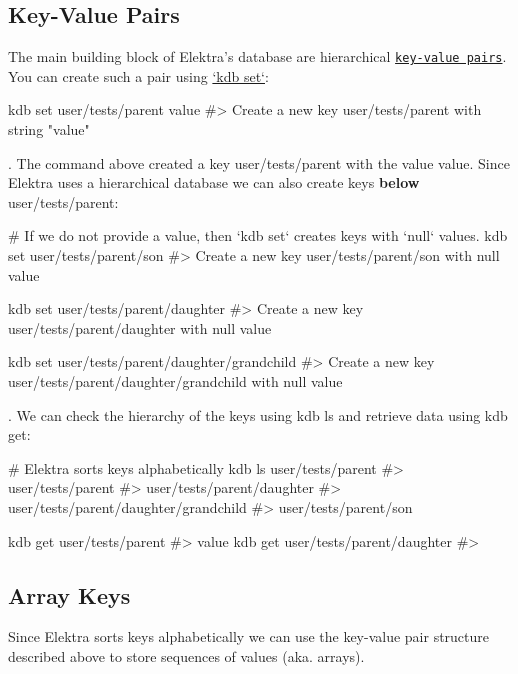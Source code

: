 \subsection*{Key-\/\+Value Pairs}

The main building block of Elektra’s database are hierarchical \href{https://en.wikipedia.org/wiki/Key-value_database}{\tt key-\/value pairs}. You can create such a pair using \hyperlink{md_doc_help_kdb-set_doc_help_kdb-set_md}{`kdb set`}\+:


\begin{DoxyCode}
kdb set user/tests/parent value
#> Create a new key user/tests/parent with string "value"
\end{DoxyCode}


. The command above created a key {\ttfamily user/tests/parent} with the value {\ttfamily value}. Since Elektra uses a hierarchical database we can also create keys {\bfseries below} {\ttfamily user/tests/parent}\+:


\begin{DoxyCode}
# If we do not provide a value, then `kdb set` creates keys with `null` values.
kdb set user/tests/parent/son
#> Create a new key user/tests/parent/son with null value

kdb set user/tests/parent/daughter
#> Create a new key user/tests/parent/daughter with null value

kdb set user/tests/parent/daughter/grandchild
#> Create a new key user/tests/parent/daughter/grandchild with null value
\end{DoxyCode}


. We can check the hierarchy of the keys using {\ttfamily kdb ls} and retrieve data using {\ttfamily kdb get}\+:


\begin{DoxyCode}
# Elektra sorts keys alphabetically
kdb ls user/tests/parent
#> user/tests/parent
#> user/tests/parent/daughter
#> user/tests/parent/daughter/grandchild
#> user/tests/parent/son

kdb get user/tests/parent
#> value
kdb get user/tests/parent/daughter
#>
\end{DoxyCode}


\subsection*{Array Keys}

Since Elektra sorts keys alphabetically we can use the key-\/value pair structure described above to store sequences of values (aka. arrays).

